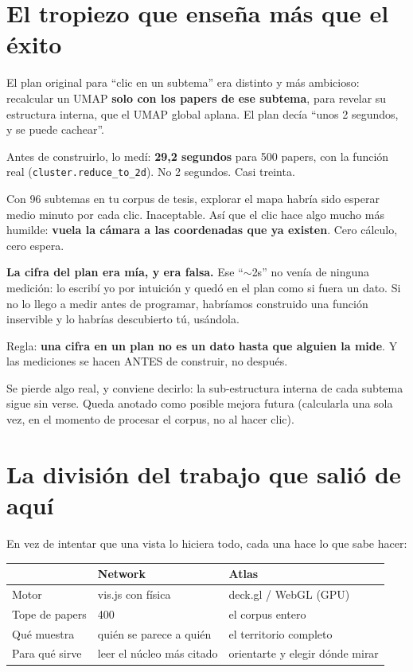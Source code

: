 \documentclass[11pt,a4paper]{article}
\begin{document}
\section{El tropiezo que enseña más que el éxito}

El plan original para ``clic en un subtema'' era distinto y más ambicioso: recalcular un
UMAP \textbf{solo con los papers de ese subtema}, para revelar su estructura interna, que
el UMAP global aplana. El plan decía ``unos 2 segundos, y se puede cachear''.

Antes de construirlo, lo medí: \textbf{29,2 segundos} para 500 papers, con la función
real (\texttt{cluster.reduce\_to\_2d}). No 2 segundos. Casi treinta.

Con 96 subtemas en tu corpus de tesis, explorar el mapa habría sido esperar medio minuto
por cada clic. Inaceptable. Así que el clic hace algo mucho más humilde: \textbf{vuela la
cámara a las coordenadas que ya existen}. Cero cálculo, cero espera.

\begin{ojo}
\textbf{La cifra del plan era mía, y era falsa.} Ese ``$\sim$2s'' no venía de ninguna medición: lo escribí yo por intuición y quedó en el
plan como si fuera un dato. Si no lo llego a medir antes de programar, habríamos
construido una función inservible y lo habrías descubierto tú, usándola.

Regla: \textbf{una cifra en un plan no es un dato hasta que alguien la mide}. Y las
mediciones se hacen ANTES de construir, no después.
\end{ojo}

Se pierde algo real, y conviene decirlo: la sub-estructura interna de cada subtema sigue
sin verse. Queda anotado como posible mejora futura (calcularla una sola vez, en el
momento de procesar el corpus, no al hacer clic).

\section{La división del trabajo que salió de aquí}

En vez de intentar que una vista lo hiciera todo, cada una hace lo que sabe hacer:

\begin{center}
\begin{tabular}{lll}
\hline
 & \textbf{Network} & \textbf{Atlas} \\
\hline
Motor          & vis.js con física   & deck.gl / WebGL (GPU) \\
Tope de papers & 400                 & el corpus entero \\
Qué muestra    & quién se parece a quién & el territorio completo \\
Para qué sirve & leer el núcleo más citado & orientarte y elegir dónde mirar \\
\hline
\end{tabular}
\end{center}
\end{document}
